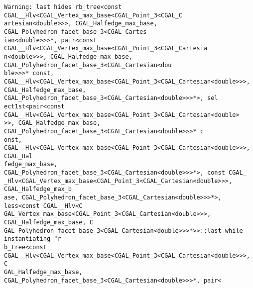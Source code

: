 
\begin{titlepage}
{\gray%
\verb+Warning: last hides rb_tree<const CGAL__Hlv<CGAL_Vertex_max_base<CGAL_Point_3<CGAL_C+\\
\verb+artesian<double>>>, CGAL_Halfedge_max_base, CGAL_Polyhedron_facet_base_3<CGAL_Cartes+\\
\verb+ian<double>>>*, pair<const CGAL__Hlv<CGAL_Vertex_max_base<CGAL_Point_3<CGAL_Cartesia+\\
\verb+n<double>>>, CGAL_Halfedge_max_base, CGAL_Polyhedron_facet_base_3<CGAL_Cartesian<dou+\\
\verb+ble>>>* const, CGAL__Hlv<CGAL_Vertex_max_base<CGAL_Point_3<CGAL_Cartesian<double>>>,+\\
\verb+CGAL_Halfedge_max_base, CGAL_Polyhedron_facet_base_3<CGAL_Cartesian<double>>>*>, sel+\\
\verb+ect1st<pair<const CGAL__Hlv<CGAL_Vertex_max_base<CGAL_Point_3<CGAL_Cartesian<double>+\\
\verb+>>, CGAL_Halfedge_max_base, CGAL_Polyhedron_facet_base_3<CGAL_Cartesian<double>>>* c+\\
\verb+onst, CGAL__Hlv<CGAL_Vertex_max_base<CGAL_Point_3<CGAL_Cartesian<double>>>, CGAL_Hal+\\
\verb+fedge_max_base, CGAL_Polyhedron_facet_base_3<CGAL_Cartesian<double>>>*>, const CGAL_+\\
\verb+_Hlv<CGAL_Vertex_max_base<CGAL_Point_3<CGAL_Cartesian<double>>>, CGAL_Halfedge_max_b+\\
\verb+ase, CGAL_Polyhedron_facet_base_3<CGAL_Cartesian<double>>>*>, less<const CGAL__Hlv<C+\\
\verb+GAL_Vertex_max_base<CGAL_Point_3<CGAL_Cartesian<double>>>, CGAL_Halfedge_max_base, C+\\
\verb+GAL_Polyhedron_facet_base_3<CGAL_Cartesian<double>>>*>>::last while instantiating "r+\\
\verb+b_tree<const CGAL__Hlv<CGAL_Vertex_max_base<CGAL_Point_3<CGAL_Cartesian<double>>>, C+\\
\verb+GAL_Halfedge_max_base, CGAL_Polyhedron_facet_base_3<CGAL_Cartesian<double>>>*, pair<+\\
}
\end{titlepage}
